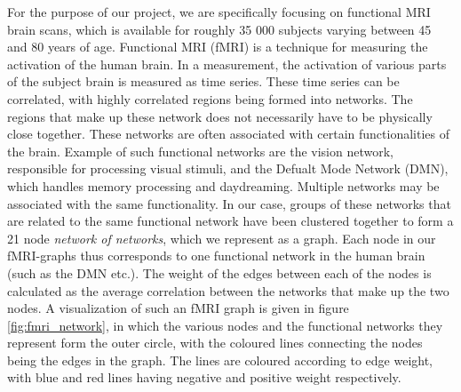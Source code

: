 For the purpose of our project, we are specifically focusing on functional MRI brain scans, which is available for roughly 35 000 subjects varying between 45 and 80 years of age. Functional MRI (fMRI) is a technique for measuring the activation of the human brain. In a measurement, the activation of various parts of the subject brain is measured as time series. These time series can be correlated, with highly correlated regions being formed into networks. The regions that make up these network does not necessarily have to be physically close together. These networks are often associated with certain functionalities of the brain. Example of such functional networks are the vision network, responsible for processing visual stimuli, and the Defualt Mode Network (DMN), which handles memory processing and daydreaming. Multiple networks may be associated with the same functionality. In our case, groups of these networks that are related to the same functional network have been clustered together to form a 21 node \textit{network of networks}, which we represent as a graph. Each node in our fMRI-graphs thus corresponds to one functional network in the human brain (such as the DMN etc.). The weight of the edges between each of the nodes is calculated as the average correlation between the networks that make up the two nodes. A visualization of such an fMRI graph is given in figure \ref{fig:fmri_network}, in which the various nodes and the functional networks they represent form the outer circle, with the coloured lines connecting the nodes being the edges in the graph. The lines are coloured according to edge weight, with blue and red lines having negative and positive weight respectively.

